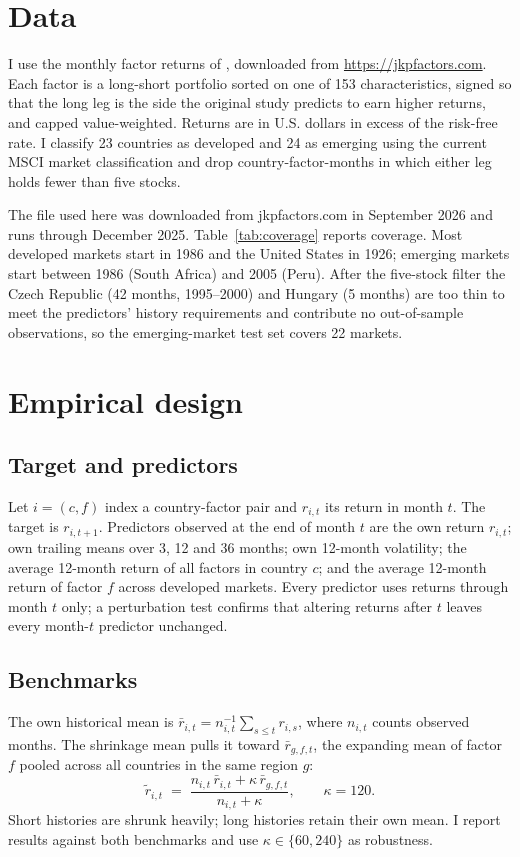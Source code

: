 \documentclass[11pt]{article}
\begin{document}
\section{Data}

I use the monthly factor returns of \citet{jensen2023replication}, downloaded from \url{https://jkpfactors.com}. Each factor is a long-short portfolio sorted on one of 153 characteristics, signed so that the long leg is the side the original study predicts to earn higher returns, and capped value-weighted. Returns are in U.S. dollars in excess of the risk-free rate. I classify 23 countries as developed and 24 as emerging using the current MSCI market classification and drop country-factor-months in which either leg holds fewer than five stocks.

The file used here was downloaded from jkpfactors.com in September 2026 and runs through December 2025. Table~\ref{tab:coverage} reports coverage. Most developed markets start in 1986 and the United States in 1926; emerging markets start between 1986 (South Africa) and 2005 (Peru). After the five-stock filter the Czech Republic (42 months, 1995--2000) and Hungary (5 months) are too thin to meet the predictors' history requirements and contribute no out-of-sample observations, so the emerging-market test set covers 22 markets.



\section{Empirical design}

\subsection{Target and predictors}
Let $i=(c,f)$ index a country-factor pair and $r_{i,t}$ its return in month $t$. The target is $r_{i,t+1}$. Predictors observed at the end of month $t$ are the own return $r_{i,t}$; own trailing means over 3, 12 and 36 months; own 12-month volatility; the average 12-month return of all factors in country $c$; and the average 12-month return of factor $f$ across developed markets. Every predictor uses returns through month $t$ only; a perturbation test confirms that altering returns after $t$ leaves every month-$t$ predictor unchanged.

\subsection{Benchmarks}
The own historical mean is $\bar r_{i,t} = n_{i,t}^{-1}\sum_{s\le t} r_{i,s}$, where $n_{i,t}$ counts observed months. The shrinkage mean pulls it toward $\bar r_{g,f,t}$, the expanding mean of factor $f$ pooled across all countries in the same region $g$:
\begin{equation}
\tilde r_{i,t} \;=\; \frac{n_{i,t}\,\bar r_{i,t} + \kappa\,\bar r_{g,f,t}}{n_{i,t} + \kappa}, \qquad \kappa = 120 .
\label{eq:shrink}
\end{equation}
Short histories are shrunk heavily; long histories retain their own mean. I report results against both benchmarks and use $\kappa \in \{60, 240\}$ as robustness.
\end{document}
